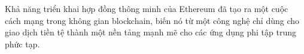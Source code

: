 Khả năng triển khai hợp đồng thông minh của Ethereum đã tạo ra một cuộc cách mạng trong không gian blockchain, biến nó từ một công nghệ chỉ dùng cho giao dịch tiền tệ thành một nền tảng mạnh mẽ cho các ứng dụng phi tập trung phức tạp.






